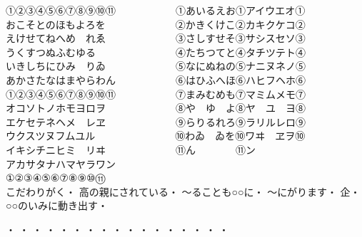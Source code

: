 ①②③④⑤⑥⑦⑧⑨⑩⑪　　　　　　①あいるえお①アイウエオ①\\
おこそとのほもよろを　　　　　　　②かきくけこ②カキクケコ②\\
えけせてねへめ　れゑ　　　　　　　③さしすせそ③サシスセソ③\\
うくすつぬふむゆる　　　　　　　　④たちつてと④タチツテト④\\
いきしちにひみ　りゐ　　　　　　　⑤なにぬねの⑤ナニヌネノ⑤\\
あかさたなはまやらわん　　　　　　⑥はひふへほ⑥ハヒフヘホ⑥\\
①②③④⑤⑥⑦⑧⑨⑩⑪　　　　　　⑦まみむめも⑦マミムメモ⑦\\
オコソトノホモヨロヲ　　　　　　　⑧や　ゆ　よ⑧ヤ　ユ　ヨ⑧\\
エケセテネヘメ　レヱ　　　　　　　⑨らりるれろ⑨ラリルレロ⑨\\
ウクスツヌフムユル　　　　　　　　⑩わゐ　ゐを⑩ワヰ　ヱヲ⑩\\
イキシチニヒミ　リヰ　　　　　　　⑪ん　　　　⑪ン　　　　　\\
アカサタナハマヤラワン　　　　　　　　　　　　　　　　　　　\\
①②③④⑤⑥⑦⑧⑨⑩⑪　　　　　　　　　　　　　　　　　　　\\

こだわりがく・
高の親にされている・
〜ることも○○に・
〜にがります・
企・
○○のいみに動き出す・










・
・
・
・
・
・
・
・
・
・
・
・
・
・
・
・
・

